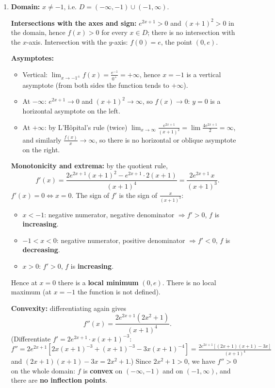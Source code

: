 \begin{solution}
\begin{enumerate}
  \item \textbf{Domain:} $x\neq -1$, i.e. $D=(-\infty,-1)\cup(-1,\infty)$.

  \textbf{Intersections with the axes and sign:} $e^{2x+1}>0$ and $(x+1)^2>0$ in the domain, hence $f(x)>0$ for every $x\in D$; there is no intersection with the $x$-axis. Intersection with the $y$-axis: $f(0)=e$, the point $(0,e)$.

  \textbf{Asymptotes:}
  \begin{itemize}
    \item Vertical: $\lim_{x\to-1^\pm}f(x)=\frac{e^{-1}}{0^+}=+\infty$, hence $x=-1$ is a vertical asymptote (from both sides the function tends to $+\infty$).
    \item At $-\infty$: $e^{2x+1}\to 0$ and $(x+1)^2\to\infty$, so $f(x)\to0$: $y=0$ is a horizontal asymptote on the left.
    \item At $+\infty$: by L'Hôpital's rule (twice) $\lim_{x\to\infty}\frac{e^{2x+1}}{(x+1)^2}=\lim\frac{4e^{2x+1}}{2}=\infty$, and similarly $\frac{f(x)}{x}\to\infty$, so there is no horizontal or oblique asymptote on the right.
  \end{itemize}

  \textbf{Monotonicity and extrema:} by the quotient rule,
  \[ f'(x)=\frac{2e^{2x+1}(x+1)^2-e^{2x+1}\cdot2(x+1)}{(x+1)^4}=\frac{2e^{2x+1}\,x}{(x+1)^3}. \]
  $f'(x)=0\iff x=0$. The sign of $f'$ is the sign of $\frac{x}{(x+1)^3}$:
  \begin{itemize}
    \item $x<-1$: negative numerator, negative denominator $\Rightarrow f'>0$, $f$ is \textbf{increasing}.
    \item $-1<x<0$: negative numerator, positive denominator $\Rightarrow f'<0$, $f$ is \textbf{decreasing}.
    \item $x>0$: $f'>0$, $f$ is \textbf{increasing}.
  \end{itemize}
  Hence at $x=0$ there is a \textbf{local minimum} $(0,e)$. There is no local maximum (at $x=-1$ the function is not defined).

  \textbf{Convexity:} differentiating again gives
  \[ f''(x)=\frac{2e^{2x+1}(2x^2+1)}{(x+1)^4}. \]
  (Differentiate $f'=2e^{2x+1}\cdot x(x+1)^{-3}$: $f''=2e^{2x+1}\left[2x(x+1)^{-3}+(x+1)^{-3}-3x(x+1)^{-4}\right]=\frac{2e^{2x+1}\left[(2x+1)(x+1)-3x\right]}{(x+1)^4}$ and $(2x+1)(x+1)-3x=2x^2+1$.)
  Since $2x^2+1>0$, we have $f''>0$ on the whole domain: $f$ is \textbf{convex} on $(-\infty,-1)$ and on $(-1,\infty)$, and there are \textbf{no inflection points}.


\end{enumerate}
\end{solution}
